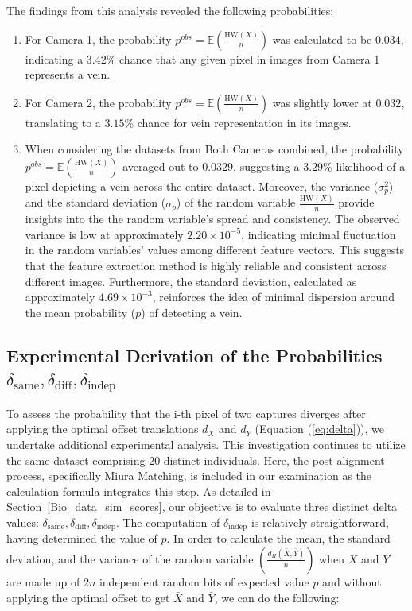 The findings from this analysis revealed the following probabilities:
\begin{enumerate}
    \item For Camera 1, the probability \(p^{obs} = \mathbb{E}\left( \frac{\text{HW}(X)}{n} \right)\) was calculated to be \(0.034\), indicating a \(3.42\)\% chance that any given pixel in images from Camera 1 represents a vein.

    \item For Camera 2, the probability \(p^{obs} = \mathbb{E}\left( \frac{\text{HW}(X)}{n} \right)\) was slightly lower at \(0.032\), translating to a \(3.15\)\% chance for vein representation in its images.

    \item When considering the datasets from Both Cameras combined, the probability \(p^{obs} = \mathbb{E}\left( \frac{\text{HW}(X)}{n} \right)\) averaged out to \(0.0329\), suggesting a \(3.29\)\% likelihood of a pixel depicting a vein across the entire dataset. Moreover, the variance (\( \sigma^{2}_p \)) and the standard deviation (\( \sigma_p \)) of the random variable \(\frac{\text{HW}(X)}{n}\) provide insights into the the random variable's spread and consistency. The observed variance is low at approximately \( 2.20 \times 10^{-5} \), indicating minimal fluctuation in the random variables' values among different feature vectors. This suggests that the feature extraction method is highly reliable and consistent across different images. Furthermore, the standard deviation, calculated as approximately \( 4.69 \times 10^{-3} \), reinforces the idea of minimal dispersion around the mean probability (\(p\)) of detecting a vein. 
    
\end{enumerate}

\newpage
\subsection{Experimental Derivation of the Probabilities \(\delta_{\text{same}}, \delta_{\text{diff}}, \delta_{\text{indep}}\)}
\label{sec:delta}

To assess the probability that the i-th pixel of two captures diverges after applying the optimal offset translations \( d_X \) and \( d_Y \) (Equation (\ref{eq:delta})), we undertake additional experimental analysis. This investigation continues to utilize the same dataset comprising 20 distinct individuals. Here, the post-alignment process, specifically Miura Matching, is included in our examination as the calculation formula integrates this step. As detailed in Section~\ref{Bio_data_sim_scores}, our objective is to evaluate three distinct delta values: \(\delta_{\text{same}}, \delta_{\text{diff}}, \delta_{\text{indep}}\). The computation of \( \delta_{\text{indep}} \) is relatively straightforward, having determined the value of \( p \). In order to calculate the mean, the standard deviation, and the variance of the random variable \(\left( \frac{d_H(\bar{X}, \bar{Y})}{n} \right)\) when \(X\) and \(Y\) are made up of \(2n\) independent random bits of expected value \(p\) and without applying the optimal offset to get \(\bar{X}\) and \(\bar{Y}\), we can do the following:

